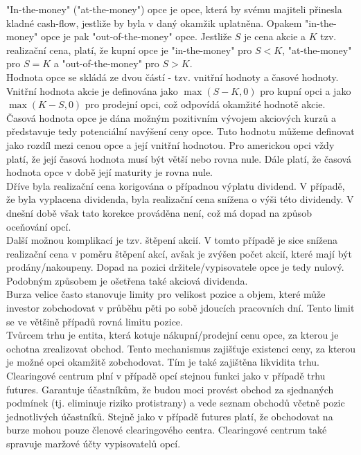 \documentclass[a4paper]{book}
\begin{document}
"In-the-money" ("at-the-money") opce je opce, která by svému majiteli přinesla kladné cash-flow, jestliže by byla v daný  okamžik uplatněna. Opakem "in-the-money" opce je pak "out-of-the-money" opce. Jestliže $S$ je cena akcie a $K$ tzv. realizační cena, platí, že kupní opce je "in-the-money" pro $S<K$, "at-the-money" pro $S=K$ a "out-of-the-money" pro $S>K$.\\

Hodnota opce se skládá ze dvou částí - tzv. vnitřní hodnoty a časové hodnoty. Vnitřní hodnota akcie je definována jako $\max(S-K,0)$ pro kupní opci a jako $\max(K-S,0)$ pro prodejní opci, což odpovídá okamžité hodnotě akcie. Časová hodnota opce je dána možným pozitivním vývojem akciových kurzů a představuje tedy potenciální navýšení ceny opce. Tuto hodnotu můžeme definovat jako rozdíl mezi cenou opce a její vnitřní hodnotou. Pro americkou opci vždy platí, že její časová hodnota musí být větší nebo rovna nule. Dále platí, že časová hodnota opce v době její maturity je rovna nule.\\

Dříve byla realizační cena korigována o případnou výplatu dividend. V případě, že byla vyplacena dividenda, byla realizační cena snížena o výši této dividendy. V dnešní době však tato korekce prováděna není, což má dopad na způsob oceňování opcí.\\
Další možnou komplikací je tzv. štěpení akcií. V tomto případě je sice snížena realizační cena v poměru štěpení akcí, avšak je zvýšen počet akcií, které mají být prodány/nakoupeny. Dopad na pozici držitele/vypisovatele opce je tedy nulový. Podobným způsobem je ošetřena také akciová dividenda.\\

Burza velice často stanovuje limity pro velikost pozice a objem, které může investor zobchodovat v průběhu pěti po sobě jdoucích pracovních dní. Tento limit se ve většině případů rovná limitu pozice.\\

Tvůrcem trhu je entita, která kotuje nákupní/prodejní cenu opce, za kterou je ochotna zrealizovat obchod. Tento mechanismus zajišťuje existenci ceny, za kterou je možné opci okamžitě zobchodovat. Tím je také zajištěna likvidita trhu.\\

Clearingové centrum plní v případě opcí stejnou funkci jako v případě trhu futures. Garantuje účastníkům, že budou moci provést obchod za sjednaných podmínek (tj. eliminuje riziko protistrany) a vede seznam obchodů včetně pozic jednotlivých účastníků. Stejně jako v případě futures platí, že obchodovat na burze mohou pouze členové clearingového centra. Clearingové centrum také spravuje maržové účty vypisovatelů opcí.
\end{document}
